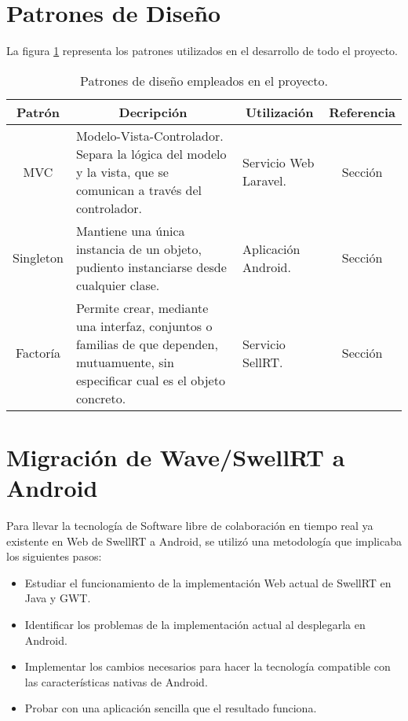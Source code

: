 \section{Patrones de Diseño}

La figura \ref{fig:tablePatrones} representa los patrones utilizados en el desarrollo de todo el proyecto.

\begin{table}[!]
\centering
\caption{Patrones de diseño empleados en el proyecto.}
\label{my-label}
\begin{tabular}{|c|m{5cm}|l|c|}
\hline
{\bf Patrón} & \multicolumn{1}{c|}{{\bf Decripción}}                                                                                                & \multicolumn{1}{c|}{{\bf Utilización}} & {\bf Referencia} \\ \hline
MVC          & Modelo-Vista-Controlador. Separa la lógica del modelo y la vista, que se comunican a través del controlador.                         & Servicio Web Laravel.                  & Sección          \\ \hline
Singleton    & Mantiene una única instancia de un objeto, pudiento instanciarse desde cualquier clase.                                              & Aplicación Android.                    & Sección          \\ \hline
Factoría     & Permite crear, mediante una interfaz, conjuntos o familias de que dependen, mutuamuente, sin especificar cual es el objeto concreto. & Servicio SellRT.                       & Sección          \\ \hline
\end{tabular}
\label{fig:tablePatrones}
\end{table}

\section{Migración de Wave/SwellRT a Android}

Para llevar la tecnología de Software libre de colaboración en tiempo real ya existente en Web de SwellRT a Android, se utilizó una metodología que implicaba los siguientes pasos:

    \begin{itemize}
      \item Estudiar el funcionamiento de la implementación Web actual de SwellRT en Java y GWT.
      \item Identificar los problemas de la implementación actual al desplegarla en Android. 
      \item Implementar los cambios necesarios para hacer la tecnología compatible con las características nativas de Android.
      \item Probar con una aplicación sencilla que el resultado funciona.
    \end{itemize}
    
